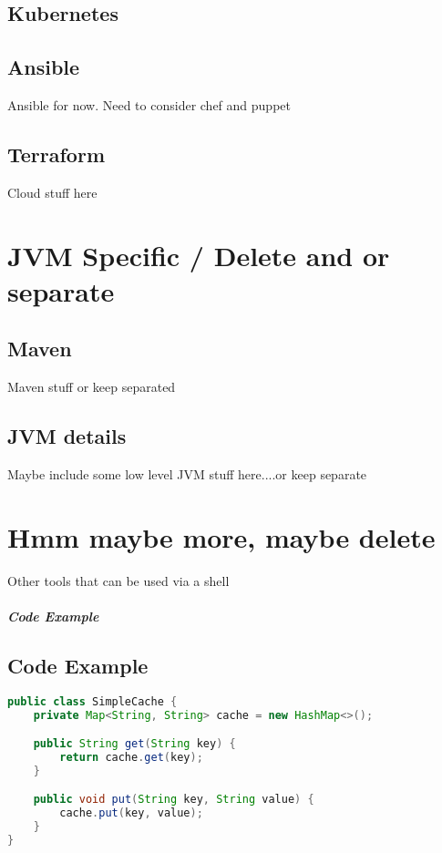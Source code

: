 \documentclass[a4paper, 11pt]{book}
\begin{document}
    \section{Kubernetes}


    \section{Ansible}
    Ansible for now. Need to consider chef and puppet


    \section{Terraform}
    Cloud stuff here


    \chapter{JVM Specific / Delete and or separate}


    \section{Maven}
    Maven stuff or keep separated


    \section{JVM details}
    Maybe include some low level JVM stuff here....or keep separate


    \chapter{Hmm maybe more, maybe delete}
    Other tools that can be used via a shell

    \paragraph{Code Example}


    \section{Code Example}
    \begin{lstlisting}[language=Java, caption=Java Code for a Simple Cache]
public class SimpleCache {
    private Map<String, String> cache = new HashMap<>();

    public String get(String key) {
        return cache.get(key);
    }

    public void put(String key, String value) {
        cache.put(key, value);
    }
}
    \end{lstlisting}
\end{document}
